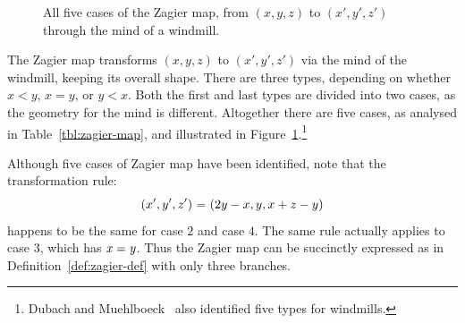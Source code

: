 \documentclass[sigplan,screen]{acmart}
\newcommand{\ee}{\ \HOLConst{=}\ } %
\renewcommand{\HOLinline}[1]{\ensuremath{#1}} %
\renewcommand{\HOLConst}[1]{{\fontsize{9pt}{1em}\selectfont\textsf{\upshape #1}}}
\renewcommand{\HOLNumLit}[1]{{\selectfont\textrm{\upshape #1}}} %
\renewcommand{\HOLSymConst}[1]{{\fontsize{9pt}{1em}\selectfont\textsf{\upshape #1}}}
\begin{document}
\begin{figure}[htbp]
\begin{center}
\caption{All five cases of the Zagier map, from $(x,y,z)$ to $(x',y',z')$ through the mind of a windmill.}
\label{fig:zagier-map} %
\end{center}
\end{figure}

The Zagier map transforms $(x,y,z)$ to $(x',y',z')$ via the mind of the windmill, keeping its overall shape.
There are three types, depending on whether $x < y$, $x = y$, or $y < x$.
Both the first and last types are divided into two cases, as the geometry for the mind is different.
Altogether there are five cases, as analysed in Table~\ref{tbl:zagier-map}, and illustrated in Figure~\ref{fig:zagier-map}.\footnote{Dubach and Muehlboeck~\cite{Dubach-Muehlboeck-2021-acm} also identified five types for windmills.}

Although five cases of Zagier map have been identified, note that the transformation rule:
\[
(x',y',z') \ee (2y - x, y, x + z - y)
\]
happens to be the same for case $2$ and case $4$.
The same rule actually applies to case $3$, which has \HOLinline{\HOLFreeVar{x}\;\HOLSymConst{=}\;\HOLFreeVar{y}}.
Thus the Zagier map can be succinctly expressed as in Definition~\ref{def:zagier-def} with only three branches.
\end{document}
